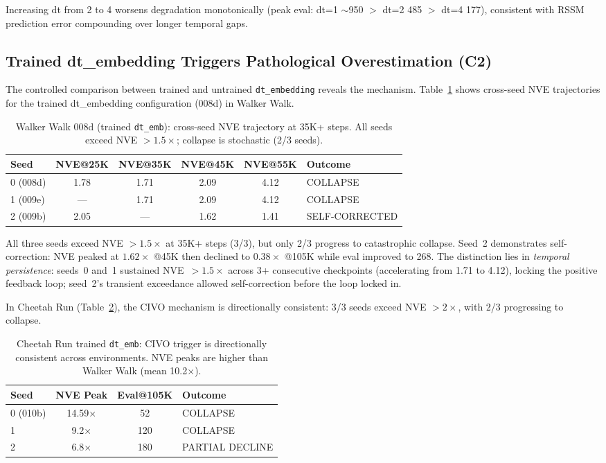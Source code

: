 \documentclass[10pt,letterpaper]{article}
\begin{document}
Increasing dt from 2 to 4 worsens degradation monotonically (peak eval: dt=1 $\sim$950 $>$ dt=2 485 $>$ dt=4 177), consistent with RSSM prediction error compounding over longer temporal gaps.

\subsection{Trained dt\_embedding Triggers Pathological Overestimation (C2)}
\label{sec:c2}

The controlled comparison between trained and untrained \texttt{dt\_embedding} reveals the mechanism.
Table~\ref{tab:c2_walker_seeds} shows cross-seed NVE trajectories for the trained dt\_embedding configuration (008d) in Walker Walk.

\begin{table}[h]
\centering
\caption{Walker Walk 008d (trained \texttt{dt\_emb}): cross-seed NVE trajectory at 35K+ steps. All seeds exceed NVE $>1.5\times$; collapse is stochastic (2/3 seeds).}
\label{tab:c2_walker_seeds}
\begin{tabular}{lccccl}
\toprule
Seed & NVE@25K & NVE@35K & NVE@45K & NVE@55K & Outcome \\
\midrule
0 (008d) & 1.78 & 1.71 & 2.09 & 4.12 & COLLAPSE \\
1 (009e) & --- & 1.71 & 2.09 & 4.12 & COLLAPSE \\
2 (009b) & 2.05 & --- & 1.62 & 1.41 & SELF-CORRECTED \\
\bottomrule
\end{tabular}
\end{table}

All three seeds exceed NVE $>1.5\times$ at 35K+ steps (3/3), but only 2/3 progress to catastrophic collapse.
Seed~2 demonstrates self-correction: NVE peaked at $1.62\times$ @45K then declined to $0.38\times$ @105K while eval improved to 268.
The distinction lies in \emph{temporal persistence}: seeds~0 and~1 sustained NVE~$>1.5\times$ across 3+ consecutive checkpoints (accelerating from 1.71 to 4.12), locking the positive feedback loop; seed~2's transient exceedance allowed self-correction before the loop locked in.

In Cheetah Run (Table~\ref{tab:c2_cheetah}), the CIVO mechanism is directionally consistent: 3/3 seeds exceed NVE $>2\times$, with 2/3 progressing to collapse.

\begin{table}[h]
\centering
\caption{Cheetah Run trained \texttt{dt\_emb}: CIVO trigger is directionally consistent across environments. NVE peaks are higher than Walker Walk (mean 10.2$\times$).}
\label{tab:c2_cheetah}
\begin{tabular}{lccl}
\toprule
Seed & NVE Peak & Eval@105K & Outcome \\
\midrule
0 (010b) & 14.59$\times$ & 52 & COLLAPSE \\
1 & 9.2$\times$ & 120 & COLLAPSE \\
2 & 6.8$\times$ & 180 & PARTIAL DECLINE \\
\bottomrule
\end{tabular}
\end{table}
\end{document}
